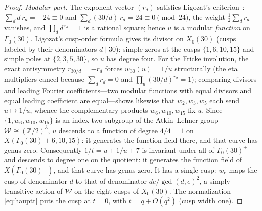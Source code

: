 \documentclass[11pt]{article}
\theoremstyle{plain}
\theoremstyle{remark}
\begin{document}
\begin{proof}
\emph{Modular part.} The exponent vector $(r_d)$ satisfies Ligozat's criterion~\cite{Ligozat1975}:
$\sum_d d\,r_d=-24\equiv0$ and $\sum_d(30/d)\,r_d=24\equiv0\pmod{24}$, the weight $\tfrac12\sum_dr_d$
vanishes, and $\prod_d d^{\,r_d}=1$ is a rational square; hence $u$ is a modular \emph{function} on
$\Gamma_0(30)$. Ligozat's cusp-order formula gives its divisor on $X_0(30)$ (cusps labeled by their
denominators $d\mid30$): simple zeros at the cusps $\{1,6,10,15\}$ and simple poles at $\{2,3,5,30\}$, so $u$
has degree four. For the Fricke involution, the exact antisymmetry $r_{30/d}=-r_d$ forces $w_{30}(u)=1/u$
structurally (the eta multipliers cancel because $\sum_dr_d=0$ and $\prod_d(30/d)^{r_d}=1$); comparing
divisors and leading Fourier coefficients---two modular functions with equal divisors and equal leading
coefficient are equal---shows likewise that $w_2,w_3,w_5$ each send $u\mapsto1/u$, whence the complementary
products $w_6,w_{10},w_{15}$ fix $u$. Since $\{1,w_6,w_{10},w_{15}\}$ is an index-two subgroup of the
Atkin--Lehner group $\mathcal{W}\cong(\mathbb{Z}/2)^3$, $u$ descends to a function of degree $4/4=1$ on
$X(\Gamma_0(30){+}6,10,15)$: it generates the function field there, and that curve has genus zero. Consequently
$1/t=u+1/u+7$ is invariant under all of $\Gamma_0(30)^+$ and descends to degree one on the quotient: it
generates the function field of $X(\Gamma_0(30)^+)$, and that curve has genus zero. It has a single cusp: $w_e$ maps the
cusp of denominator $d$ to that of denominator $de/\gcd(d,e)^2$, a simply transitive action of $\mathcal{W}$ on the
eight cusps of $X_0(30)$. The normalization \eqref{eq:hauptt} puts the cusp at $t=0$, with $t=q+O(q^2)$ (cusp
width one).


\end{proof}
\end{document}
